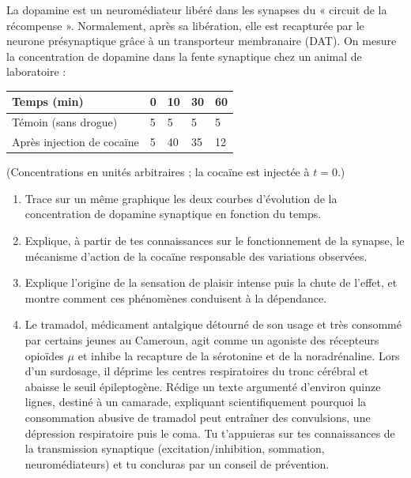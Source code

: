 \documentclass[11pt]{article}
\begin{document}
\begin{exercice}
La dopamine est un neuromédiateur libéré dans les synapses du « circuit de la récompense ». Normalement, après sa libération, elle est recapturée par le neurone présynaptique grâce à un transporteur membranaire (DAT). On mesure la concentration de dopamine dans la fente synaptique chez un animal de laboratoire :

\begin{center}
\begin{tabularx}{\linewidth}{|l|X|X|X|X|}
\hline
\rowcolor{popblueL} Temps (min) & 0 & 10 & 30 & 60 \\
\hline
Témoin (sans drogue) & 5 & 5 & 5 & 5 \\
\hline
Après injection de cocaïne & 5 & 40 & 35 & 12 \\
\hline
\end{tabularx}
\end{center}
(Concentrations en unités arbitraires ; la cocaïne est injectée à $t = 0$.)

\begin{enumerate}
\item Trace sur un même graphique les deux courbes d'évolution de la concentration de dopamine synaptique en fonction du temps.
\item Explique, à partir de tes connaissances sur le fonctionnement de la synapse, le mécanisme d'action de la cocaïne responsable des variations observées.
\item Explique l'origine de la sensation de plaisir intense puis la chute de l'effet, et montre comment ces phénomènes conduisent à la dépendance.
\item Le tramadol, médicament antalgique détourné de son usage et très consommé par certains jeunes au Cameroun, agit comme un agoniste des récepteurs opioïdes $\mu$ et inhibe la recapture de la sérotonine et de la noradrénaline. Lors d'un surdosage, il déprime les centres respiratoires du tronc cérébral et abaisse le seuil épileptogène. Rédige un texte argumenté d'environ quinze lignes, destiné à un camarade, expliquant scientifiquement pourquoi la consommation abusive de tramadol peut entraîner des convulsions, une dépression respiratoire puis le coma. Tu t'appuieras sur tes connaissances de la transmission synaptique (excitation/inhibition, sommation, neuromédiateurs) et tu concluras par un conseil de prévention.
\end{enumerate}
\end{exercice}
\end{document}
